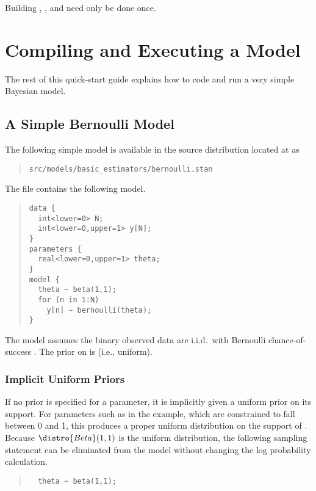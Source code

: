 Building , , and  need only be done once.

\section{Compiling and Executing a Model}

The rest of this quick-start guide explains how to code
and run a very simple Bayesian model.

\subsection{A Simple Bernoulli Model}

The following simple model is available in the source
distribution located at  as
%
\begin{quote}
\nolinkurl{src/models/basic_estimators/bernoulli.stan}
\end{quote}
%
The file contains the following model.
%
\begin{quote}
\begin{Verbatim}
data { 
  int<lower=0> N; 
  int<lower=0,upper=1> y[N];
} 
parameters {
  real<lower=0,upper=1> theta;
} 
model {
  theta ~ beta(1,1);
  for (n in 1:N) 
    y[n] ~ bernoulli(theta);
}
\end{Verbatim}
\end{quote}
%
The model assumes the binary observed data 
are i.i.d.\ with Bernoulli chance-of-success .  The
prior on  is  (i.e., uniform).

\subsubsection{Implicit Uniform Priors}

If no prior is specified for a parameter, it is implicitly given a
uniform prior on its support.  For parameters such as  in
the example, which are constrained to fall between 0 and 1, this
produces a proper uniform distribution on the support of .
Because $\distro{Beta}(1,1)$ is the uniform distribution, the
following sampling statement can be eliminated from the model without
changing the log probability calculation.
%
\begin{quote}
\begin{Verbatim}
  theta ~ beta(1,1);
\end{Verbatim}
\end{quote}

